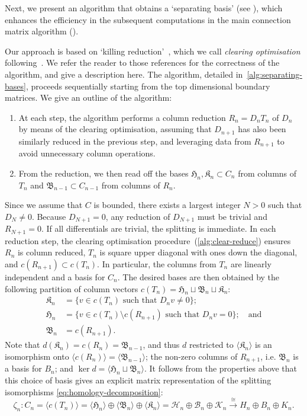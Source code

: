 \documentclass[11pt, table, nothms]{amsart}
\theoremstyle{definition}
\newcommand{\B}{\mathcal{B}}
\newcommand{\cK}{\mathcal{K}}
\newcommand{\cH}{\mathcal{H}}
\newcommand{\fB}{\mathfrak{B}}
\newcommand{\fH}{\mathfrak{H}}
\newcommand{\fK}{\mathfrak{K}}
\begin{document}
{Next, we present an algorithm that obtains a `separating basis' (see ), which enhances the efficiency in the subsequent computations in the main connection matrix algorithm ().


Our approach is based on `killing reduction'~\cite{Chen2011}, which we call \emph{clearing optimisation} following~\cite{Bauer2014ClearChunks}. 
We refer the reader to those references for the correctness of the algorithm, and give a description here.  
The algorithm, detailed in~\cref{alg:separating-bases}, proceeds sequentially starting from the top dimensional boundary matrices. We give an outline of the algorithm:
\begin{enumerate}
    \item At each step, the algorithm performs a column reduction $R_n = D_n T_n$ of $D_n$ by means of the clearing optimisation, assuming that $D_{n+1}$ has also been similarly reduced in the previous step, and leveraging data from $R_{n+1}$ to avoid unnecessary column operations.
    \item From the reduction, we then read off the bases $\fH_n, \fK_n \subset C_n$ from columns of $T_n$ and  $\fB_{n-1} \subset C_{n-1}$ from columns of $R_n$.
\end{enumerate}
Since we assume that $C$ is bounded, there exists a largest integer $N >0$ such that $D_N\neq 0$. Because $D_{N+1}=0$, any reduction of $D_{N+1}$ must be trivial and $R_{N+1}=0$. If all differentials are trivial, the splitting is immediate.
In each reduction step, the clearing optimisation procedure~(\cref{alg:clear-reduce}) ensures $R_n$ is column reduced,  
$T_n$ is square upper diagonal with ones down the diagonal, and $c(R_{n+1}) \subset c(T_n)$. 
In particular, the columns from $T_n$ are linearly independent and a basis for $C_n$. 
The desired bases are then obtained by the following partition of column vectors $c(T_n) = \fH_n \sqcup \fB_n \sqcup \fK_n$:
\begin{align}
\fK_n & = \{ v  \in c(T_n) \mbox{ such that } D_n v \neq 0\}; \\
   \fH_n & = \{ v  \in c(T_n) \setminus c(R_{n+1}) \mbox{ such that } D_n v = 0 \}; \quad \text{and}\\
   \fB_{n} & =c(R_{n+1}).
\end{align}
Note that $d(\fK_n) = c(R_n) = \fB_{n-1}$, and thus $d$ restricted to $\langle \fK_n \rangle$ is an isomorphism onto $\langle c(R_n) \rangle = \langle \fB_{n-1} \rangle$; the non-zero columns of $R_{n+1}$, i.e. $\fB_n$ is a basis for $B_n$; and $\ker d = \langle \fH_n \sqcup \fB_n \rangle$. It follows from the properties above that this choice of basis gives an explicit matrix representation of the splitting isomorphisms \cref{eq:homology-decomposition}:
\begin{equation}\label{eq:direct-sum-split-bases}
\zeta_n: C_n = \langle c(T_n)\rangle = 
\langle \fH_n\rangle \oplus \langle \fB_n\rangle \oplus \langle \fK_n\rangle = 
\cH_n \oplus \B_n \oplus \cK_n \xrightarrow{\cong} H_n \oplus B_n \oplus K_n
.
\end{equation}

}
\end{document}
